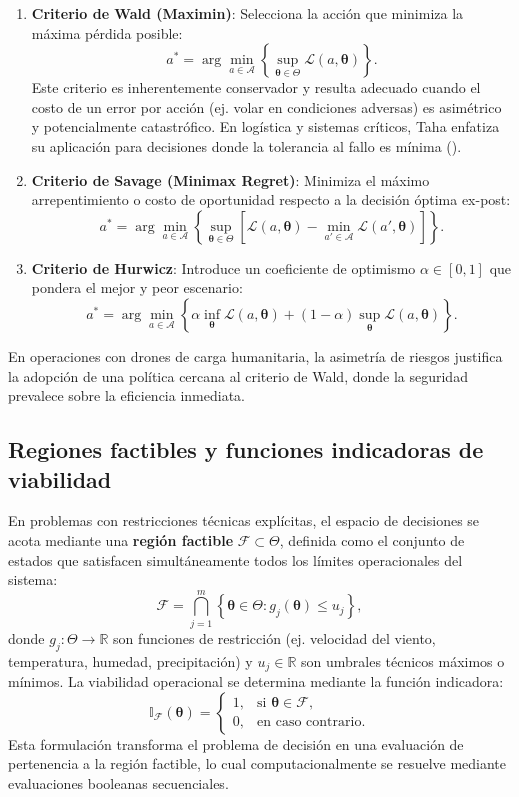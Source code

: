 \documentclass[
  spanish,
  us-letterpaper,
]{scrreprt}
\numberwithin{equation}{section}
\begin{document}
\begin{enumerate}
\def\labelenumi{\arabic{enumi}.}
\item
  \textbf{Criterio de Wald (Maximin)}: Selecciona la acción que minimiza
  la máxima pérdida posible: \[
  a^* = \arg\min_{a \in \mathcal{A}} \left\{ \sup_{\boldsymbol{\theta} \in \Theta} \mathcal{L}(a, \boldsymbol{\theta}) \right\}.
  \] Este criterio es inherentemente conservador y resulta adecuado
  cuando el costo de un error por acción (ej. volar en condiciones
  adversas) es asimétrico y potencialmente catastrófico. En logística y
  sistemas críticos, Taha enfatiza su aplicación para decisiones donde
  la tolerancia al fallo es mínima
  ().
\item
  \textbf{Criterio de Savage (Minimax Regret)}: Minimiza el máximo
  arrepentimiento o costo de oportunidad respecto a la decisión óptima
  ex-post: \[
  a^* = \arg\min_{a \in \mathcal{A}} \left\{ \sup_{\boldsymbol{\theta} \in \Theta} \left[ \mathcal{L}(a, \boldsymbol{\theta}) - \min_{a' \in \mathcal{A}} \mathcal{L}(a', \boldsymbol{\theta}) \right] \right\}.
  \]
\item
  \textbf{Criterio de Hurwicz}: Introduce un coeficiente de optimismo
  \(\alpha \in [0,1]\) que pondera el mejor y peor escenario: \[
  a^* = \arg\min_{a \in \mathcal{A}} \left\{ \alpha \inf_{\boldsymbol{\theta}} \mathcal{L}(a, \boldsymbol{\theta}) + (1-\alpha) \sup_{\boldsymbol{\theta}} \mathcal{L}(a, \boldsymbol{\theta}) \right\}.
  \]
\end{enumerate}

En operaciones con drones de carga humanitaria, la asimetría de riesgos
justifica la adopción de una política cercana al criterio de Wald, donde
la seguridad prevalece sobre la eficiencia inmediata.

\subsection{Regiones factibles y funciones indicadoras de
viabilidad}\label{regiones-factibles-y-funciones-indicadoras-de-viabilidad}

En problemas con restricciones técnicas explícitas, el espacio de
decisiones se acota mediante una \textbf{región factible}
\(\mathcal{F} \subset \Theta\), definida como el conjunto de estados que
satisfacen simultáneamente todos los límites operacionales del sistema:
\[
\mathcal{F} = \bigcap_{j=1}^{m} \left\{ \boldsymbol{\theta} \in \Theta : g_j(\boldsymbol{\theta}) \leq u_j \right\},
\] donde \(g_j: \Theta \to \mathbb{R}\) son funciones de restricción
(ej. velocidad del viento, temperatura, humedad, precipitación) y
\(u_j \in \mathbb{R}\) son umbrales técnicos máximos o mínimos. La
viabilidad operacional se determina mediante la función indicadora: \[
\mathbb{I}_{\mathcal{F}}(\boldsymbol{\theta}) = 
\begin{cases}
1, & \text{si } \boldsymbol{\theta} \in \mathcal{F}, \\
0, & \text{en caso contrario}.
\end{cases}
\] Esta formulación transforma el problema de decisión en una evaluación
de pertenencia a la región factible, lo cual computacionalmente se
resuelve mediante evaluaciones booleanas secuenciales.
\end{document}

